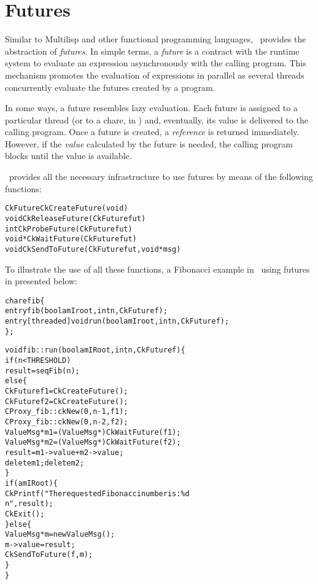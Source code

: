 \section{Futures}
\label{futures}

Similar to Multilisp and other functional programming languages, \charmpp\
provides the abstraction of {\em futures}. In simple terms, a {\em future} is a
contract with the runtime system to evaluate an expression asynchronously with
the calling program. This mechanism promotes the evaluation of expressions in
parallel as several threads concurrently evaluate the futures created by a
program.

In some ways, a future resembles lazy evaluation. Each future is assigned to a
particular thread (or to a chare, in \charmpp) and, eventually, its value is
delivered to the calling program. Once a future is created, a {\em
reference} is returned immediately. However, if the {\em value} calculated by the future
is needed, the calling program blocks until the value is available.

\charmpp\ provides all the necessary infrastructure to use futures by means of
the following functions: 

\begin{alltt}
 CkFuture CkCreateFuture(void)
 void CkReleaseFuture(CkFuture fut)
 int CkProbeFuture(CkFuture fut)
 void *CkWaitFuture(CkFuture fut)
 void  CkSendToFuture(CkFuture fut, void *msg)
\end{alltt}

To illustrate the use of all these functions, a Fibonacci example in \charmpp\
using futures in presented below:

\begin{alltt}
chare fib \{
  entry fib(bool amIroot, int n, CkFuture f);
  entry  [threaded] void run(bool amIroot, int n, CkFuture f);
\};
\end{alltt}

\begin{alltt}
void  fib::run(bool amIRoot, int n, CkFuture f) \{
   if (n < THRESHOLD)
    result = seqFib(n);
  else \{
    CkFuture f1 = CkCreateFuture();
    CkFuture f2 = CkCreateFuture();
    CProxy_fib::ckNew(0, n-1, f1);
    CProxy_fib::ckNew(0, n-2, f2);
    ValueMsg * m1 = (ValueMsg *) CkWaitFuture(f1);
    ValueMsg * m2 = (ValueMsg *) CkWaitFuture(f2);
    result = m1->value + m2->value;
    delete m1; delete m2;
  \}
  if (amIRoot) \{
    CkPrintf("The requested Fibonacci number is : \%d\\n", result);
    CkExit();  
  \} else \{
    ValueMsg *m = new ValueMsg();
    m->value = result;
    CkSendToFuture(f, m); 
  \}
\}
\end{alltt}

